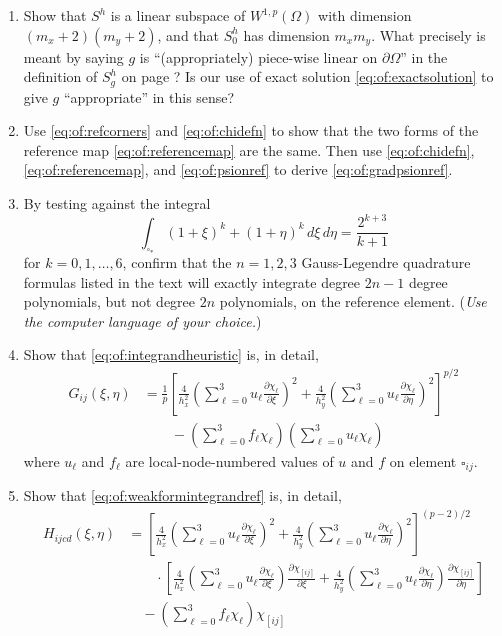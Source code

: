 \begin{enumerate}
\item Show that $S^h$ is a linear subspace of $W^{1,p}(\Omega)$ with dimension $(m_x+2)(m_y+2)$, and that $S_0^h$ has dimension $m_x m_y$.  What precisely is meant by saying $g$ is ``(appropriately) piece-wise linear on $\partial\Omega$'' in the definition of $S_g^h$ on page \pageref{eq:of:Sghdefn}?  Is our use of exact solution \eqref{eq:of:exactsolution} to give $g$ ``appropriate'' in this sense?

\item  Use \eqref{eq:of:refcorners} and \eqref{eq:of:chidefn} to show that the two forms of the reference map \eqref{eq:of:referencemap} are the same.  Then use \eqref{eq:of:chidefn}, \eqref{eq:of:referencemap}, and \eqref{eq:of:psionref} to derive \eqref{eq:of:gradpsionref}.

\item By testing against the integral
    $$\int_{\square_\ast} (1+\xi)^k + (1+\eta)^k\,d\xi\, d\eta = \frac{2^{k+3}}{k+1}$$
for $k=0,1,\dots,6$, confirm that the $n=1,2,3$ Gauss-Legendre quadrature formulas listed in the text will exactly integrate degree $2n-1$ degree polynomials, but not degree $2n$ polynomials, on the reference element.  (\emph{Use the computer language of your choice.})

\item \label{exer:of:integrand}  Show that \eqref{eq:of:integrandheuristic} is, in detail,
\begin{align*}
G_{ij}(\xi,\eta) &= \frac{1}{p} \left[\frac{4}{h_x^2} \left(\sum_{\ell=0}^3 u_\ell \frac{\partial\chi_\ell}{\partial \xi}\right)^2 + \frac{4}{h_y^2} \left(\sum_{\ell=0}^3 u_\ell \frac{\partial\chi_\ell}{\partial \eta}\right)^2\right]^{p/2} \\
  &\qquad - \left(\sum_{\ell=0}^3 f_\ell \chi_\ell\right) \left(\sum_{\ell=0}^3 u_\ell \chi_\ell\right)
\end{align*}
where $u_\ell$ and $f_\ell$ are local-node-numbered values of $u$ and $f$ on element $\square_{ij}$.

\item \label{exer:of:weakformintegrand}  Show that \eqref{eq:of:weakformintegrandref} is, in detail,
\begin{align*}
H_{ijcd}(\xi,\eta) &= \left[\frac{4}{h_x^2} \left(\sum_{\ell=0}^3 u_\ell \frac{\partial\chi_\ell}{\partial \xi}\right)^2 + \frac{4}{h_y^2} \left(\sum_{\ell=0}^3 u_\ell \frac{\partial\chi_\ell}{\partial \eta}\right)^2\right]^{(p-2)/2} \\
  &\qquad \cdot \left[\frac{4}{h_x^2} \left(\sum_{\ell=0}^3 u_\ell \frac{\partial\chi_\ell}{\partial \xi}\right) \frac{\partial\chi_{[ij]}}{\partial \xi} + \frac{4}{h_y^2} \left(\sum_{\ell=0}^3 u_\ell \frac{\partial\chi_\ell}{\partial \eta}\right) \frac{\partial\chi_{[ij]}}{\partial \eta}\right] \\
  &\quad - \left(\sum_{\ell=0}^3 f_\ell \chi_\ell\right) \chi_{[ij]}
\end{align*}


\end{enumerate}
